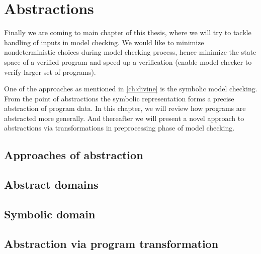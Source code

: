 \chapter{Abstractions}\label{ch:abstraction}

Finally we are coming to main chapter of this thesis, where we will try to tackle
handling of inputs in model checking. We would like to minimize nondeterministic
choices during model checking process, hence minimize the state space of a
verified program and speed up a verification (enable model checker to verify
larger set of programs).

One of the approaches as mentioned in \autoref{ch:divine} is the symbolic model checking.
From the point of abstractions the symbolic representation forms a precise abstraction
of program data. In this chapter, we will review how programs are abstracted more generally.
And thereafter we will present a novel approach to abstractions via transformations
in preprocessing phase of model checking.

\section{ Approaches of abstraction }


\section{Abstract domains} \label{sec:absdom}


\section{Symbolic domain}



\section{ Abstraction via program transformation }

